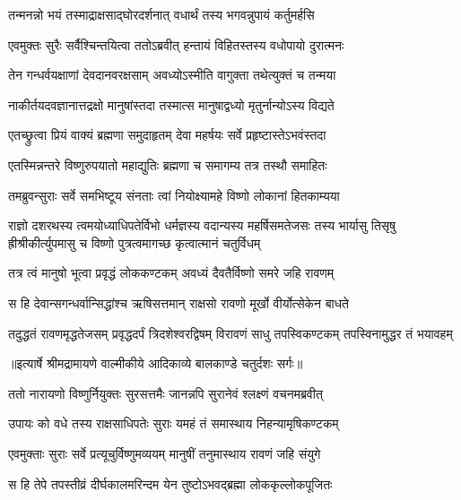 \twolineshloka
{तन्मनन्नो भयं तस्माद्राक्षसाद्घोरदर्शनात्}
{वधार्थं तस्य भगवन्नुपायं कर्तुमर्हसि} %

\twolineshloka
{एवमुक्तः सुरैः सर्वैश्चिन्तयित्वा ततोऽब्रवीत्}
{हन्तायं विहितस्तस्य वधोपायो दुरात्मनः} %

\twolineshloka
{तेन गन्धर्वयक्षाणां देवदानवरक्षसाम्}
{अवध्योऽस्मीति वागुक्ता तथेत्युक्तं च तन्मया} %

\twolineshloka
{नाकीर्तयदवज्ञानात्तद्रक्षो मानुषांस्तदा}
{तस्मात्स मानुषाद्वध्यो मृतुर्नान्योऽस्य विद्यते} %

\twolineshloka
{एतच्छ्रुत्वा प्रियं वाक्यं ब्रह्मणा समुदाहृतम्}
{देवा महर्षयः सर्वे प्रहृष्टास्तेऽभवंस्तदा} %

\twolineshloka
{एतस्मिन्नन्तरे विष्णुरुपयातो महाद्युतिः}
{ब्रह्मणा च समागम्य तत्र तस्थौ समाहितः} %

\twolineshloka
{तमब्रुवन्सुराः सर्वे समभिष्टूय संनताः}
{त्वां नियोक्ष्यामहे विष्णो लोकानां हितकाम्यया} %

\fourlineshloka
{राज्ञो दशरथस्य त्वमयोध्याधिपतेर्विभो}
{धर्मज्ञस्य वदान्यस्य महर्षिसमतेजसः}
{तस्य भार्यासु तिसृषु ह्रीश्रीकीर्त्युपमासु च}
{विष्णो पुत्रत्वमागच्छ कृत्वात्मानं चतुर्विधम्} %

\twolineshloka
{तत्र त्वं मानुषो भूत्वा प्रवृद्धं लोककण्टकम्}
{अवध्यं दैवतैर्विष्णो समरे जहि रावणम्} %

\twolineshloka
{स हि देवान्सगन्धर्वान्सिद्धांश्च ऋषिसत्तमान्}
{राक्षसो रावणो मूर्खो वीर्योत्सेकेन बाधते} %

\fourlineindentedshloka
{तदुद्धतं रावणमृद्धतेजसम्}
{प्रवृद्धदर्पं त्रिदशेश्वरद्विषम्}
{विरावणं साधु तपस्विकण्टकम्}
{तपस्विनामुद्धर तं भयावहम्} %


{॥इत्यार्षे श्रीमद्रामायणे वाल्मीकीये आदिकाव्ये बालकाण्डे चतुर्दशः सर्गः॥}


\twolineshloka
{ततो नारायणो विष्णुर्नियुक्तः सुरसत्तमैः}
{जानन्नपि सुरानेवं श्लक्ष्णं वचनमब्रवीत्} %

\twolineshloka
{उपायः को वधे तस्य राक्षसाधिपतेः सुराः}
{यमहं तं समास्थाय निहन्यामृषिकण्टकम्} %

\twolineshloka
{एवमुक्ताः सुराः सर्वे प्रत्यूचुर्विष्णुमव्ययम्}
{मानुषीं तनुमास्थाय रावणं जहि संयुगे} %

\twolineshloka
{स हि तेपे तपस्तीव्रं दीर्घकालमरिन्दम}
{येन तुष्टोऽभवद्ब्रह्मा लोककृल्लोकपूजितः} %

